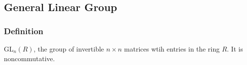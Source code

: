 \subsection{General Linear Group}\label{generallineargroup}

\subsubsection{Definition}
GL$_n(R)$, the group of invertible $n \times n$ matrices wtih entries in the ring $R$. It is noncommutative.